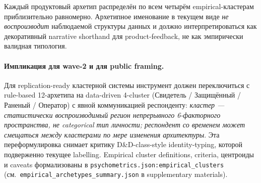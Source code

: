 Каждый продуктовый архетип распределён по всем четырём empirical-кластерам приблизительно равномерно. Архетипное именование в текущем виде \emph{не воспроизводит} наблюдаемой структуры данных и должно интерпретироваться как декоративный narrative shorthand для product-feedback, не как эмпирически валидная типология.

\paragraph{Импликация для wave-2 и для public framing.} Для replication-ready кластерной системы инструмент должен переключиться с rule-based 12-архетипа на data-driven 4-cluster (Свидетель / Защищённый / Раненый / Оператор) с явной коммуникацией респонденту: \emph{кластер --- статистически воспроизводимый регион непрерывного 6-факторного пространства, не categorical тип личности; респондент со временем может смещаться между кластерами по мере изменения архитектуры}. Эта переформулировка снимает критику D\&D-class-style identity-typing, которой подверженно текущее labelling. Empirical cluster definitions, criteria, центроиды и caveats формализованы в \texttt{psychometrics.json:empirical\_clusters} (см.\ \texttt{empirical\_archetypes\_summary.json} в supplementary materials).
